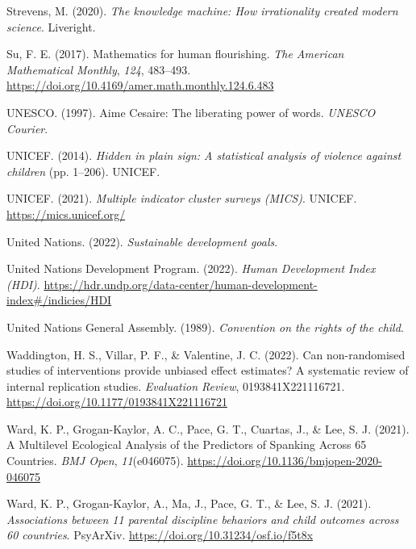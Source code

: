 \documentclass[
  letterpaper,
  DIV=11,
  numbers=noendperiod]{scrreprt}
\newlength{\cslhangindent}
\newlength{\cslentryspacingunit} %
\newenvironment{CSLReferences}[2] %
 {%
  \setlength{\parindent}{0pt}
  \ifodd #1
  \let\oldpar\par
  \def\par{\hangindent=\cslhangindent\oldpar}
  \fi
  \setlength{\parskip}{#2\cslentryspacingunit}
 }%
 {}
\begin{document}
\begin{CSLReferences}{1}{0}
\leavevmode{}%
Strevens, M. (2020). \emph{The knowledge machine: How irrationality
created modern science}. Liveright.

\leavevmode{}%
Su, F. E. (2017). Mathematics for human flourishing. \emph{The American
Mathematical Monthly}, \emph{124}, 483--493.
\url{https://doi.org/10.4169/amer.math.monthly.124.6.483}

\leavevmode{}%
UNESCO. (1997). {A}ime {C}esaire: The liberating power of words.
\emph{UNESCO Courier}.

\leavevmode{}%
UNICEF. (2014). \emph{Hidden in plain sign: A statistical analysis of
violence against children} (pp. 1--206). UNICEF.

\leavevmode{}%
UNICEF. (2021). \emph{Multiple indicator cluster surveys (MICS)}.
UNICEF. \url{https://mics.unicef.org/}

\leavevmode{}%
United Nations. (2022). \emph{Sustainable development goals}.

\leavevmode{}%
United Nations Development Program. (2022). \emph{{Human Development
Index (HDI)}}.
\url{https://hdr.undp.org/data-center/human-development-index\#/indicies/HDI}

\leavevmode{}%
United Nations General Assembly. (1989). \emph{Convention on the rights
of the child}.

\leavevmode{}%
Waddington, H. S., Villar, P. F., \& Valentine, J. C. (2022). Can
non-randomised studies of interventions provide unbiased effect
estimates? A systematic review of internal replication studies.
\emph{Evaluation Review}, 0193841X221116721.
\url{https://doi.org/10.1177/0193841X221116721}

\leavevmode{}%
Ward, K. P., Grogan-Kaylor, A. C., Pace, G. T., Cuartas, J., \& Lee, S.
J. (2021). {A Multilevel Ecological Analysis of the Predictors of
Spanking Across 65 Countries}. \emph{BMJ Open}, \emph{11}(e046075).
\url{https://doi.org/10.1136/bmjopen-2020-046075}

\leavevmode{}%
Ward, K. P., Grogan-Kaylor, A., Ma, J., Pace, G. T., \& Lee, S. J.
(2021). \emph{Associations between 11 parental discipline behaviors and
child outcomes across 60 countries}. PsyArXiv.
\url{https://doi.org/10.31234/osf.io/f5t8x}


\end{CSLReferences}
\end{document}
